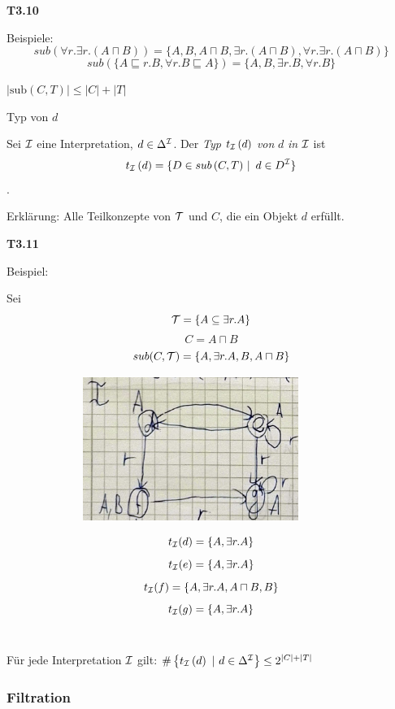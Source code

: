 \textbf{T3.10}

Beispiele: $$sub(\forall r.\exists r.(A \sqcap B)) = \{A,B,A \sqcap B, \exists r.(A \sqcap B), \forall r.\exists r.(A \sqcap B)\}$$
$$sub(\{A \sqsubseteq r.B, \forall r.B \sqsubseteq A\}) = \{A,B, \exists r.B, \forall r.B\}$$

\begin{lemma}

$\left| \text{sub}\left( C,T \right) \right| \leq \left| C \right| + \left| T \right|$
\end{lemma}

\begin{definition}{Typ von $d$}

Sei $\mathcal{I}$ eine Interpretation, $d \in \Delta^{\mathcal{I}}$. Der \emph{Typ}
$t_{\mathcal{I}}\left( d \right)$ \emph{von} $d$ \emph{in} $\mathcal{I}$ ist
$$t_{\mathcal{I}}\left( d \right) = \left\{ D \in sub\left( C,T \right)\  \right|\ d \in D^{\mathcal{I}}\}$$.
\end{definition}
Erklärung: Alle Teilkonzepte von $\mathcal{T}$ und $C$, die ein Objekt $d$
erfüllt.

\textbf{T3.11}

Beispiel:

Sei $$\mathcal{T}=\{A \subseteq \exists r.A\}$$
$$C = A \sqcap B$$
$$sub(C,\mathcal{T})=\{A, \exists r.A, B, A \sqcap B\}$$

\includegraphics[width=4.71910in,height=1.83200in]{media/314typ.png}

$$t_{\mathcal{I}}(d)=\{A, \exists r.A\}$$
$$t_{\mathcal{I}}(e)=\{A, \exists r.A\}$$
$$t_{\mathcal{I}}(f)=\{A, \exists r.A, A \sqcap B, B\}$$
$$t_{\mathcal{I}}(g)=\{A, \exists r.A\}$$ \\

\begin{lemma}

Für jede Interpretation $\mathcal{I}$ gilt:
$\#\left\{ t_{\mathcal{I}}\left( d \right)\ |\ d \in \Delta^{\mathcal{I}} \right\} \leq 2^{\left| C \right| + |T|}$
\end{lemma}

\subsubsection{Filtration}\label{filtration}

